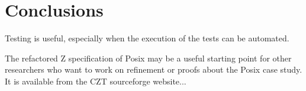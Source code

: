 \documentclass{llncs}
\begin{document}
\section{Conclusions}

Testing is useful, especially when the execution of the tests can
be automated.

The refactored Z specification of Posix may be a useful starting point
for other researchers who want to work on refinement or proofs
about the Posix case study.  It is available from the CZT sourceforge
website...


%
%


%
\end{document}
